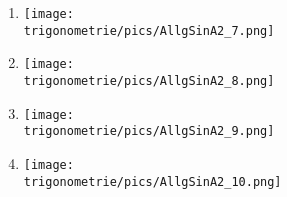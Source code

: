 \begin{Exercise}[title={Stelle jeweils die Funktionsgleichung vom Typ \(a\cdot \sin\left(bx\right)+d\)\\oder \(a\cdot \cos\left(bx\right)+d\) auf.}, label=allgSinCosA2]
\begin{minipage}{\textwidth}
\begin{minipage}{0.49\textwidth}
\begin{enumerate}[label=\alph*)]
				\item \begin{minipage}{.9\textwidth}
					\texttt{[image: \\trigonometrie/pics/AllgSinA2\_7.png]}\\
				\end{minipage}
				\item \begin{minipage}{.9\textwidth}
					\texttt{[image: \\trigonometrie/pics/AllgSinA2\_8.png]}\\
				\end{minipage}
				\item \begin{minipage}{.9\textwidth}
					\texttt{[image: \\trigonometrie/pics/AllgSinA2\_9.png]}\\
				\end{minipage}
				\item \begin{minipage}{.9\textwidth}
					\texttt{[image: \\trigonometrie/pics/AllgSinA2\_10.png]}\\
				\end{minipage}
			\end{enumerate}
		\end{minipage}
	\end{minipage}
\end{Exercise}


